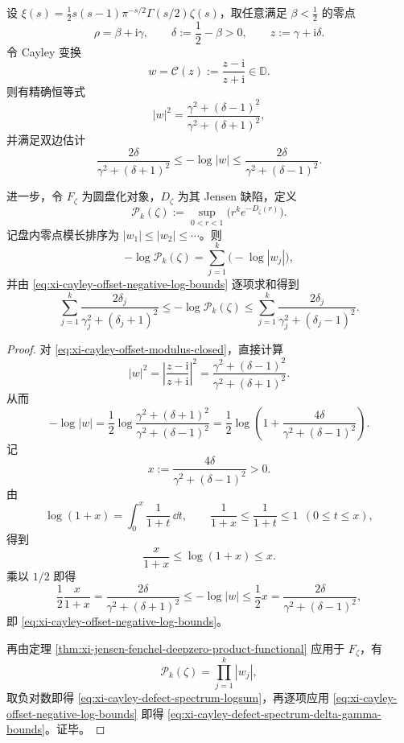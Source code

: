 \begin{theorem}\label{thm:xi-cayley-offset-defect-spectrum-bounds}
设 \(\xi(s)=\frac12 s(s-1)\pi^{-s/2}\Gamma(s/2)\zeta(s)\)，取任意满足 \(\beta<\frac12\) 的零点
\[
\rho=\beta+\mathrm i\gamma,\qquad
\delta:=\frac12-\beta>0,\qquad
z:=\gamma+\mathrm i\delta.
\]
令 Cayley 变换
\[
w=\mathcal C(z):=\frac{z-\mathrm i}{z+\mathrm i}\in\mathbb D.
\]
则有精确恒等式
\begin{equation}\label{eq:xi-cayley-offset-modulus-closed}
|w|^2=\frac{\gamma^2+(\delta-1)^2}{\gamma^2+(\delta+1)^2},
\end{equation}
并满足双边估计
\begin{equation}\label{eq:xi-cayley-offset-negative-log-bounds}
\boxed{\;
\frac{2\delta}{\gamma^2+(\delta+1)^2}
\le -\log|w|
\le \frac{2\delta}{\gamma^2+(\delta-1)^2}. \;}
\end{equation}

进一步，令 \(F_\zeta\) 为圆盘化对象，\(D_\zeta\) 为其 Jensen 缺陷，定义
\[
\mathcal P_k(\zeta):=\sup_{0<r<1}\bigl(r^k e^{-D_\zeta(r)}\bigr).
\]
记盘内零点模长排序为 \(|w_1|\le |w_2|\le\cdots\)。则
\begin{equation}\label{eq:xi-cayley-defect-spectrum-logsum}
-\log\mathcal P_k(\zeta)=\sum_{j=1}^{k}\bigl(-\log|w_j|\bigr),
\end{equation}
并由 \eqref{eq:xi-cayley-offset-negative-log-bounds} 逐项求和得到
\begin{equation}\label{eq:xi-cayley-defect-spectrum-delta-gamma-bounds}
\sum_{j=1}^{k}\frac{2\delta_j}{\gamma_j^2+(\delta_j+1)^2}
\le -\log\mathcal P_k(\zeta)
\le
\sum_{j=1}^{k}\frac{2\delta_j}{\gamma_j^2+(\delta_j-1)^2}.
\end{equation}
\end{theorem}
\begin{proof}
对 \eqref{eq:xi-cayley-offset-modulus-closed}，直接计算
\[
|w|^2
=\left|\frac{z-\mathrm i}{z+\mathrm i}\right|^2
=\frac{\gamma^2+(\delta-1)^2}{\gamma^2+(\delta+1)^2}.
\]
从而
\[
-\log|w|
=\frac12\log\frac{\gamma^2+(\delta+1)^2}{\gamma^2+(\delta-1)^2}
=\frac12\log\!\left(1+\frac{4\delta}{\gamma^2+(\delta-1)^2}\right).
\]
记
\[
x:=\frac{4\delta}{\gamma^2+(\delta-1)^2}>0.
\]
由
\[
\log(1+x)=\int_0^x\frac{1}{1+t}\,\dd t,\qquad
\frac{1}{1+x}\le \frac{1}{1+t}\le 1\ \ (0\le t\le x),
\]
得到
\[
\frac{x}{1+x}\le \log(1+x)\le x.
\]
乘以 \(1/2\) 即得
\[
\frac12\frac{x}{1+x}
=\frac{2\delta}{\gamma^2+(\delta+1)^2}
\le -\log|w|
\le \frac12 x
=\frac{2\delta}{\gamma^2+(\delta-1)^2},
\]
即 \eqref{eq:xi-cayley-offset-negative-log-bounds}。

再由定理 \ref{thm:xi-jensen-fenchel-deepzero-product-functional} 应用于 \(F_\zeta\)，有
\[
\mathcal P_k(\zeta)=\prod_{j=1}^{k}|w_j|,
\]
取负对数即得 \eqref{eq:xi-cayley-defect-spectrum-logsum}，再逐项应用
\eqref{eq:xi-cayley-offset-negative-log-bounds} 即得
\eqref{eq:xi-cayley-defect-spectrum-delta-gamma-bounds}。证毕。
\end{proof}

